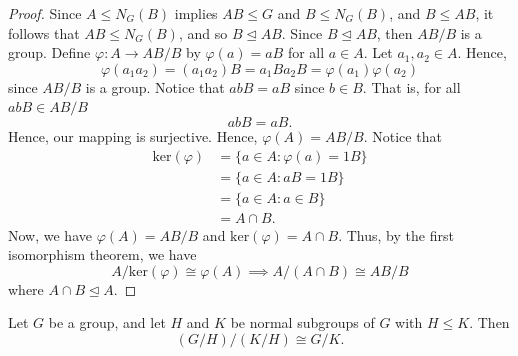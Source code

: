 \begin{proof}
    Since \( A \leq {N}_{G}(B) \) implies \( AB \leq G  \) and \( B \leq  {N}_{G}(B)  \), and \( B \leq AB \), it follows that \( AB \leq {N}_{G}(B) \), and so \( B \trianglelefteq AB \). Since \( B \trianglelefteq AB  \), then \( AB / B  \) is a group. Define \( \varphi : A \to AB / B  \) by \( \varphi(a) = aB  \) for all \( a \in A  \). Let \( {a}_{1}, {a}_{2} \in A  \). Hence, \[ \varphi({a}_{1} {a}_{2}) = ({a}_{1} {a}_{2}) B  = {a}_{1} B {a}_{2} B = \varphi({a}_{1}) \varphi({a}_{2})  \] since \( AB / B  \) is a group. Notice that \( ab B  = aB  \) since \( b \in B  \). That is, for all \( ab B  \in AB /B  \)  
    \[  ab B = a B. \]
    Hence, our mapping is surjective. Hence, \( \varphi (A) = AB / B  \). Notice that \begin{align*}
        \text{ker}(\varphi) &= \{  a \in A : \varphi(a) =  1B \}  \\
                            &= \{  a \in A : a B = 1 B  \}  \\
                            &= \{  a \in A : a \in B  \}  \\
                            &= A \cap B.
\end{align*}
Now, we have \( \varphi(A) = AB / B  \) and \( \text{ker}(\varphi) = A \cap B  \). Thus, by the first isomorphism theorem, we have 
\[ A / \text{ker}(\varphi) \cong \varphi(A) \implies A / (A \cap B) \cong AB / B   \]
where \( A \cap B \trianglelefteq A \).
\end{proof}

\begin{theorem}
Let \( G  \) be a group, and let \( H  \) and \( K  \) be normal subgroups of \( G  \) with \( H \leq K  \). Then       
\[  (G / H) / (K / H) \cong G / K.  \]
\end{theorem}

